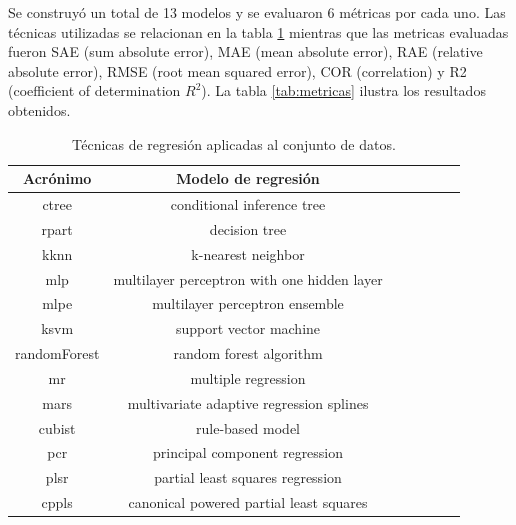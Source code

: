 Se construyó un total de 13 modelos y se evaluaron 6 métricas por cada uno.  Las técnicas utilizadas se relacionan en la tabla \ref{tab:tecnicas} mientras que las metricas evaluadas fueron SAE (sum absolute error), MAE (mean absolute error), RAE (relative absolute error), RMSE (root mean squared error), COR (correlation) y R2 (coefficient of determination $R^2$).  La tabla \ref{tab:metricas} ilustra los resultados obtenidos.

\begin{table}
\caption{Técnicas de regresión aplicadas al conjunto de datos.}
\label{tab:tecnicas}
\centering
\begin{tabular}{c c c c c c c}
\toprule
Acrónimo & Modelo de regresión \\
\midrule
 ctree & conditional inference tree\\
 rpart  & decision tree\\
 kknn  & k-nearest neighbor\\ 
 mlp  & multilayer perceptron with one hidden layer\\ 
 mlpe  & multilayer perceptron ensemble\\
 ksvm  & support vector machine\\ 
 randomForest  & random forest algorithm\\ 
 mr  & multiple regression\\ 
 mars  & multivariate adaptive regression splines\\ 
 cubist  & rule-based model\\ 
 pcr &  principal component regression \\
 plsr  & partial least squares regression \\
 cppls  & canonical powered partial least squares\\
\bottomrule
\end{tabular}
\end{table}

